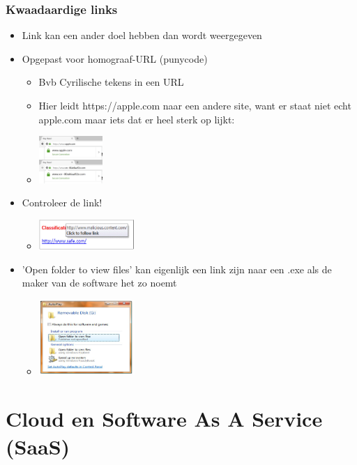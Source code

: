 \documentclass{article}
\begin{document}
\subsubsection{Kwaadaardige links}

\begin{itemize}
    \item Link kan een ander doel hebben dan wordt weergegeven
    \item Opgepast voor homograaf-URL (punycode)
    \begin{itemize}
        \item Bvb Cyrilische tekens in een URL
        \item Hier leidt https://apple.com naar een andere site, want er staat niet echt apple.com maar iets dat er heel sterk op lijkt:
        \item \includegraphics[width=0.2\textwidth]{link2.png}
    \end{itemize}
    \item Controleer de link! 
    \begin{itemize}
        \item \includegraphics[width=0.3\textwidth]{link.png}
    \end{itemize}
    \item 'Open folder to view files' kan eigenlijk een link zijn naar een .exe als de maker van de software het zo noemt
    \begin{itemize}
        \item \includegraphics[width=0.3\textwidth]{open-folder.png}
    \end{itemize}
\end{itemize}

\section{Cloud en Software As A Service (SaaS)}
\end{document}
